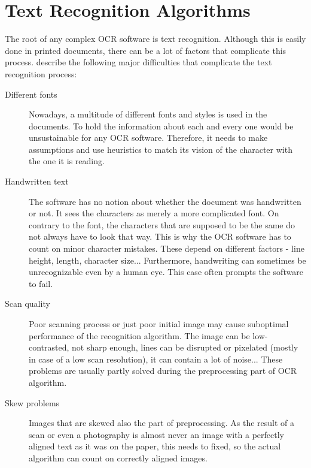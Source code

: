 \chapter{Text Recognition Algorithms}

The root of any complex OCR software is text recognition.
Although this is easily done in printed documents, there can be a lot of factors that complicate this process.
\citet{preprocessAll} describe the following major difficulties that complicate the text recognition process: 

\begin{description}
\item[Different fonts] Nowadays, a multitude of different fonts and styles is used in the documents. To hold the information about each and every one would be unsustainable for any OCR software. Therefore, it needs to make assumptions and use heuristics to match its vision of the character with the one it is reading.
\item[Handwritten text]  The software has no notion about whether the document was handwritten or not. It sees the characters as merely a more complicated font. On contrary to the font, the characters that are supposed to be the same do not always have to look that way. This is why the OCR software has to count on minor character mistakes. These depend on different factors - line height, length, character size... Furthermore, handwriting can sometimes be unrecognizable even by a human eye. This case often prompts the software to fail.
\item[Scan quality] Poor scanning process or just poor initial image may cause suboptimal performance of the recognition algorithm. The image can be low-contrasted, not sharp enough, lines can be disrupted or pixelated (mostly in case of a low scan resolution), it can contain a lot of noise... These problems are usually partly solved during the preprocessing part of OCR algorithm.
\item[Skew problems] Images that are skewed also  the part of preprocessing. As the result of a scan or even a photography is almost never an image with a perfectly aligned text as it was on the paper, this needs to fixed, so the actual algorithm can count on correctly aligned images.

\end{description}
